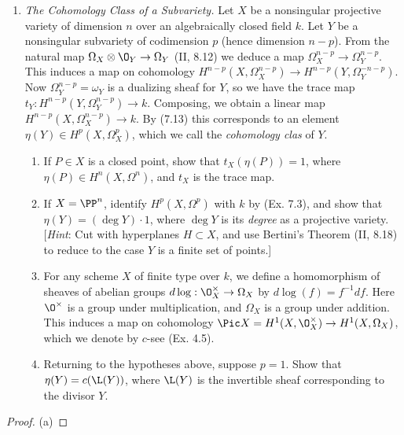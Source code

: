 \documentclass[12pt]{amsart}
\begin{document}
\begin{enumerate}
  \item[7.4.] {
      \emph{The Cohomology Class of a Subvariety.}
      Let $X$ be a nonsingular projective variety of dimension $n$ over an algebraically closed field $k$.
      Let $Y$ be a nonsingular subvariety of codimension $p$ (hence dimension $n-p$).
      From the natural map $\Omega_X\otimes \O_Y\to \Omega_Y$ (II, 8.12) we deduce a map $\Omega_X^{n-p}\to \Omega_Y^{n-p}$.
      This induces a map on cohomology $H^{n-p}(X,\Omega_X^{n-p})\to H^{n-p}(Y,\Omega_Y^{-n-p})$.
      Now $\Omega_Y^{n-p}=\omega_Y$ is a dualizing sheaf for $Y$, so we have the trace map $t_Y:H^{n-p}(Y,\Omega_Y^{n-p})\to k$.
      Composing, we obtain a linear map $H^{n-p}(X,\Omega_X^{n-p})\to k$.
      By (7.13) this corresponds to an element $\eta(Y)\in H^p(X,\Omega_X^p)$, which we call the \emph{cohomology clas} of $Y$.
      \begin{enumerate}
        \item If $P\in X$ is a closed point, show that $t_X(\eta(P))=1$, where $\eta(P)\in H^n(X,\Omega^n)$, and $t_X$ is the trace map.
        \item If $X=\PP^n$, identify $H^p(X,\Omega^p)$ with $k$ by (Ex. 7.3), and show that $\eta(Y)=(\deg Y)\cdot 1$, where $\deg Y$ is its \emph{degree} as a projective variety.
          [\emph{Hint}: Cut with hyperplanes $H\subset X$, and use Bertini's Theorem (II, 8.18) to reduce to the  case $Y$ is a finite set of points.]
        \item For any scheme $X$ of finite type over $k$, we define a homomorphism of sheaves of abelian groups $d\log:\O_X^\times\to \Omega_X$ by $d\log(f)=f^{-1}df$.
          Here $\O^\times$ is a group under multiplication, and $\Omega_X$ is a group under addition.
          This induces a map on cohomology $\Pic X=H^1(X,\O_X^\times)\to H^1(X,\Omega_X)$, which we denote by $c$-see (Ex. 4.5).
        \item Returning to the hypotheses above, suppose $p=1$.
          Show that $\eta(Y)=c(\L(Y))$, where $\L(Y)$ is the invertible sheaf corresponding to the divisor $Y$.
      \end{enumerate}
    }
\end{enumerate}

\begin{proof}
  (a)
\end{proof}
\end{document}

